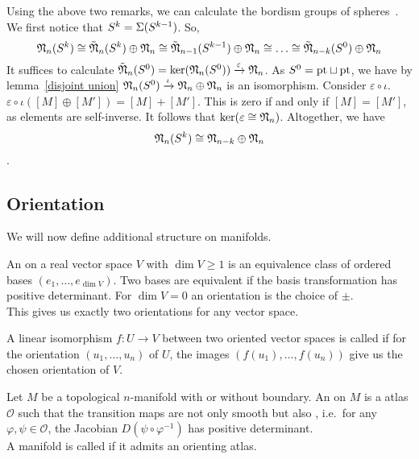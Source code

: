\documentclass[a4paper,11pt]{article}
\begin{document}
Using the above two remarks, we can calculate the bordism groups of spheres\ \cite[Proposition 6.1]{zhang}. We first notice that \(S^k=\Sigma(S^{k-1})\). So,
\[\mathfrak{N}_n(S^k)\cong\tilde{\mathfrak{N}}_n(S^k)\oplus\mathfrak{N}_n\cong\tilde{\mathfrak{N}}_{n-1}(S^{k-1})\oplus\mathfrak{N}_n\cong\dots\cong\tilde{\mathfrak{N}}_{n-k}(S^0)\oplus\mathfrak{N}_n\]
It suffices to calculate \(\tilde{\mathfrak{N}}_n(S^0)=\ker(\mathfrak{N}_n(S^0))\xrightarrow{\varepsilon}\mathfrak{N}_n\). As \(S^0=\mathrm{pt}\sqcup\mathrm{pt}\), we have by lemma\ \ref{disjoint union} \(\mathfrak{N}_n(S^0)\xrightarrow{\iota}\mathfrak{N}_n\oplus\mathfrak{N}_n\) is an isomorphism. 
Consider \(\varepsilon\circ\iota\).\ \(\varepsilon\circ\iota([M]\oplus[M'])=[M]+[M']\). This is zero if and only if \([M]=[M']\), as elements are self-inverse. It follows that \(\ker(\varepsilon\cong\mathfrak{N}_n)\). 
Altogether, we have \[\mathfrak{N}_n(S^k)\cong\mathfrak{N}_{n-k}\oplus\mathfrak{N}_n\].

\subsection{Orientation}

We will now define additional  structure on manifolds.


\begin{definition}%
    An  on a real vector space \(V\) with \(\dim V\geq 1\) is an equivalence class of ordered bases \((e_1,\dots,e_{\dim V})\). Two bases are equivalent if the basis transformation has positive determinant. 
    For \(\dim V=0\) an orientation is the choice of \(\pm\).\\
    This gives us exactly two orientations for any vector space.
\end{definition}

\begin{definition}
    A linear isomorphism \(f:U\to V\) between two oriented vector spaces is called  if for the orientation \((u_1,\dots,u_n)\) of \(U\), the images \((f(u_1),\dots,f(u_n))\) give us the chosen orientation of \(V\).
\end{definition}

\begin{definition}
    Let \(M\) be a topological \(n\)-manifold with or without boundary. An  on \(M\) is a atlas \(\mathcal{O}\) such that the transition maps are not only smooth but also , i.e.\ for any \(\varphi,\psi\in\mathcal{O}\), the Jacobian \(D(\psi\circ\varphi^{-1})\) has positive determinant.\\
    A manifold is called  if it admits an orienting atlas.
\end{definition}
\end{document}
